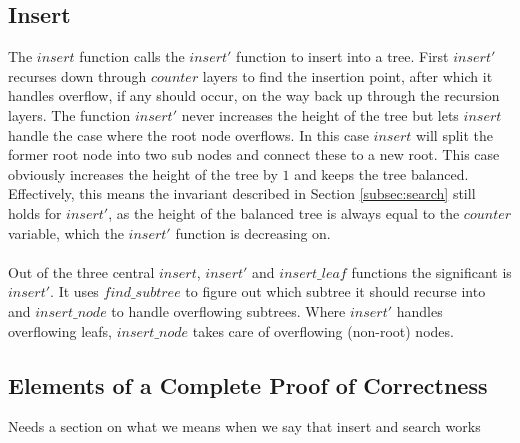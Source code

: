 \subsection{Insert}
The $insert$ function calls the $insert'$ function to insert into a tree. First $insert'$ recurses down through $counter$ layers to find the insertion point, after which it handles overflow, if any should occur, on the way back up through the recursion layers. The function $insert'$ never increases the height of the tree but lets $insert$ handle the case where the root node overflows. In this case $insert$ will split the former root node into two sub nodes and connect these to a new root. This case obviously increases the height of the tree by $1$ and keeps the tree balanced. Effectively, this means the invariant described in Section \ref{subsec:search} still holds for $insert'$, as the height of the balanced tree is always equal to the $counter$ variable, which the $insert'$ function is decreasing on.
\paragraph{}
Out of the three central $insert$, $insert'$ and $insert\_leaf$ functions the significant is $insert'$. It uses $find\_subtree$ to figure out which subtree it should recurse into and $insert\_node$ to handle overflowing subtrees. Where $insert'$ handles overflowing leafs, $insert\_node$ takes care of overflowing (non-root) nodes.

\subsection{Elements of a Complete Proof of Correctness}

Needs a section on what we means when we say that insert and search works













